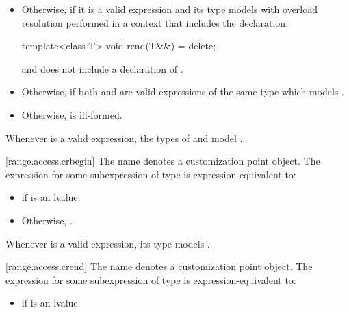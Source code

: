\begin{addedblock}
\begin{itemize}
\item
  Otherwise,  if it is a valid
  expression and its type  models
   with overload
  resolution performed in a context that includes the declaration:
  \begin{codeblock}
  template<class T> void rend(T&&) = delete;
  \end{codeblock}
  and does not include a declaration of .

\item
  Otherwise,  if both
   and  are valid
  expressions of the same type  which models
  .

\item
  Otherwise,  is ill-formed.
\end{itemize}

\pnum
\begin{note}
Whenever  is a valid expression, the
types of  and 
model .
\end{note}

[range.access.crbegin]{}
\pnum
The name  denotes a customization point
object. The expression
 for some subexpression  of type
 is expression-equivalent to:
\begin{itemize}
\item {} if  is
  an lvalue.
\item Otherwise, .
\end{itemize}

\pnum
\begin{note}
Whenever  is a valid expression, its
type models .
\end{note}

[range.access.crend]{}
\pnum
The name  denotes a customization point
object. The expression
 for some subexpression  of type 
is expression-equivalent to:
\begin{itemize}
\item {} if  is an lvalue.


\end{itemize}
\end{addedblock}
